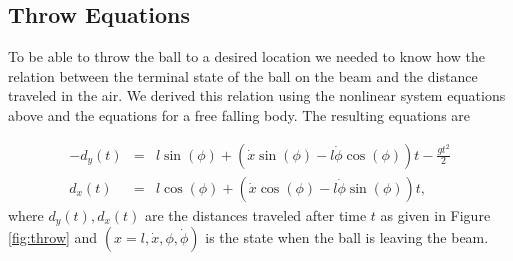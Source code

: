 


\subsection{Throw Equations}

To be able to throw the ball to a desired location we needed to know how the relation between the terminal state of the ball on the beam and the distance traveled in the air.
We derived this relation using the nonlinear system equations above and the equations for a free falling body.
The resulting equations are












\begin{eqnarray*}
-d_{y}(t) & = & l\sin(\phi)+\left(\dot{x}\sin(\phi)-l\dot{\phi}\cos(\phi)\right)t-\frac{gt^{2}}{2}\\
d_{x}(t) & = & l\cos(\phi)+\left(\dot{x}\cos(\phi)-l\dot{\phi}\sin(\phi)\right)t,
\end{eqnarray*}
where $d_{y}(t), d_{x}(t)$ are the distances traveled after time $t$ as given in Figure \ref{fig:throw} and $(x=l,\dot x,\phi, \dot{\phi})$ is the state when the ball is leaving the beam.

